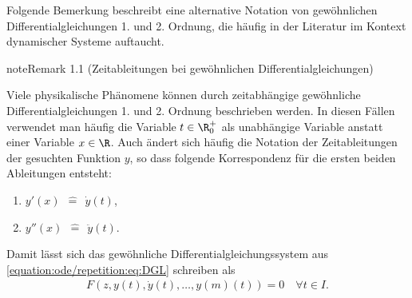 \documentclass[letterpaper,10pt,english]{jupyterBook}
\begin{document}
\sphinxAtStartPar
Folgende Bemerkung beschreibt eine alternative Notation von gewöhnlichen Differentialgleichungen 1. und 2. Ordnung, die häufig in der Literatur im Kontext dynamischer Systeme auftaucht.
\label{ode/repetition:remark-1}
\begin{sphinxadmonition}{note}{Remark 1.1 (Zeitableitungen bei gewöhnlichen Differentialgleichungen)}



\sphinxAtStartPar
Viele physikalische Phänomene können durch zeitabhängige gewöhnliche Differentialgleichungen 1. und 2. Ordnung beschrieben werden.
In diesen Fällen verwendet man häufig die Variable \(t \in \R^+_0\) als unabhängige Variable anstatt einer Variable \(x \in \R\).
Auch ändert sich häufig die Notation der Zeitableitungen der gesuchten Funktion \(y\), so dass folgende Korrespondenz für die ersten beiden Ableitungen entsteht:
\begin{enumerate}
%
\item {} 
\sphinxAtStartPar
\(y'(x) \ \ \hat{=} \ \ \dot{y}(t)\),

\item {} 
\sphinxAtStartPar
\(y''(x) \ \ \hat{=} \ \ \ddot{y}(t)\).

\end{enumerate}

\sphinxAtStartPar
Damit lässt sich das gewöhnliche Differentialgleichungssystem aus \eqref{equation:ode/repetition:eq:DGL} schreiben als
\begin{equation}\label{equation:ode/repetition:eq:DGL_time}
\begin{split}F(z, y(t), \dot{y}(t), \ldots, y{(m)}(t)) = 0 \quad \forall t\in I.\end{split}
\end{equation}\end{sphinxadmonition}
\end{document}
